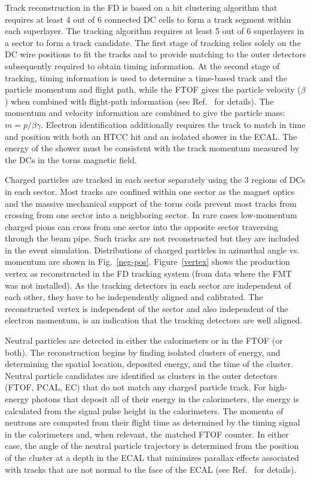 \documentclass[final,3p]{elsarticle}
\begin{document}
\begin{twocolumn}
Track reconstruction in the FD is based on a hit clustering algorithm that requires at least 4 out of 6 connected DC
cells to form a track segment within each superlayer.  The tracking algorithm requires at least 5 out of 6 superlayers
in a sector to form a track candidate. The first stage of tracking relies solely on the DC wire positions to fit the
tracks and to provide matching to the outer detectors subsequently required to obtain timing information. At the
second stage of tracking, timing information is used to determine a time-based track and the particle momentum
and flight path, while the FTOF gives the particle velocity ($\beta$) when combined with flight-path information
(see Ref.~\cite{Software} for details). The momentum and velocity information are combined to give the particle
mass: $m = p/\beta\gamma$. Electron identification additionally requires the track to match in time and position
with both an HTCC hit and an isolated shower in the ECAL. The energy of the shower must be consistent with the
track momentum measured by the DCs in the torus magnetic field. 

Charged particles are tracked in each sector separately using the 3 regions of DCs in each sector. Most tracks
are confined within one sector as the magnet optics and the massive mechanical support of the torus coils prevent
most tracks from crossing from one sector into a neighboring sector. In rare cases low-momentum charged pions
can cross from one sector into the opposite sector traversing through the beam pipe. Such tracks are not
reconstructed but they are included in the event simulation. Distributions of charged particles in azimuthal angle vs.
momentum are shown in Fig.~\ref{neg-pos}. Figure~\ref{vertex} shows the production vertex as reconstructed in the
FD tracking system (from data where the FMT was not installed). As the tracking detectors in each sector are
independent of each other, they have to be independently aligned and calibrated. The reconstructed vertex is
independent of the sector and also independent of the electron momentum, is an indication that the tracking
detectors are well aligned.  

Neutral particles are detected in either the calorimeters or in the FTOF (or both). The reconstruction begins by
finding isolated clusters of energy, and determining the spatial location, deposited energy, and the time of the
cluster. Neutral particle candidates are identified as clusters in the outer detectors (FTOF, PCAL, EC) that do
not match any charged particle track. For high-energy photons that deposit all of their energy in the calorimeters,
the energy is calculated from the signal pulse height in the calorimeters. The momenta of neutrons are computed
from their flight time as determined by the timing signal in the calorimeters and, when relevant, the matched
FTOF counter. In either case, the angle of the neutral particle trajectory is determined from the position of the
cluster at a depth in the ECAL that minimizes parallax effects associated with tracks that are not normal to the
face of the ECAL (see Ref.~\cite{ECAL} for details).


\end{twocolumn}
\end{document}
